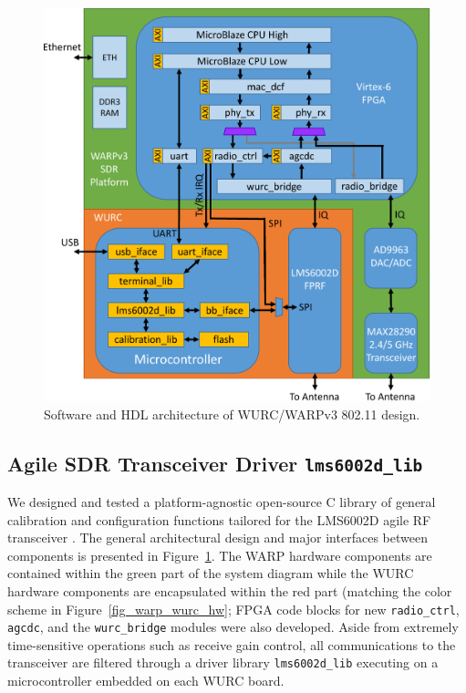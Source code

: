 \begin{figure}[p]
	\centering
  \includegraphics[width=1\linewidth]{figs/wurc/wurc_80211_hdl_design}   
  \caption{Software and HDL architecture of WURC/WARPv3 802.11 design.}
	\label{fig_wurc_80211_arch}
\end{figure}
	
\subsection{Agile \ac{SDR} Transceiver Driver \texttt{lms6002d\_lib}}
\label{sec_wurc_lms_lib}

	We designed and tested a platform-agnostic open-source C library of general calibration and configuration functions tailored for the LMS6002D agile RF transceiver \cite{guerra2013lms6002d}.
	The general architectural design and major interfaces between components is presented in Figure~\ref{fig_wurc_80211_arch}.
	The \ac{WARP} hardware components are contained within the green part of the system diagram while the \ac{WURC} hardware components are encapsulated within the red part (matching the color scheme in Figure~\ref{fig_warp_wurc_hw}; \ac{FPGA} code blocks for new \texttt{radio\_ctrl}, \texttt{agcdc}, and the \texttt{wurc\_bridge} modules were also developed.
	Aside from extremely time-sensitive operations such as receive gain control, all communications to the transceiver are filtered through a driver library \texttt{lms6002d\_lib} executing on a microcontroller embedded on each \ac{WURC} board.
	
